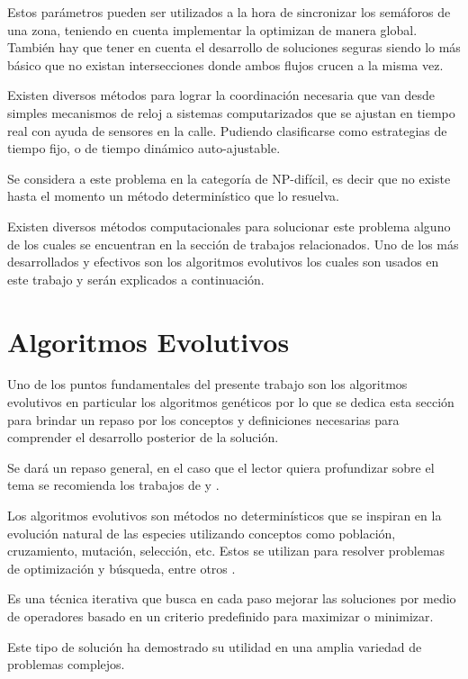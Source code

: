 Estos parámetros pueden ser utilizados a la hora de sincronizar los semáforos de una zona, teniendo en cuenta implementar la optimizan de manera global. También hay que tener en cuenta el desarrollo de soluciones seguras siendo lo más básico que no existan intersecciones donde ambos flujos crucen a la misma vez.

Existen diversos métodos para lograr la coordinación necesaria que van desde simples mecanismos de reloj a sistemas computarizados que se ajustan en tiempo real con ayuda de sensores en la calle. Pudiendo clasificarse como estrategias de tiempo fijo, o de tiempo dinámico auto-ajustable.

Se considera a este problema en la categoría de NP-difícil, es decir que no existe hasta el momento un método determinístico que lo resuelva.

Existen diversos métodos computacionales para solucionar este problema alguno de los cuales se encuentran en la sección de trabajos relacionados. Uno de los más desarrollados y efectivos son los algoritmos evolutivos los cuales son usados en este trabajo y serán explicados a continuación.

\section{Algoritmos Evolutivos}

Uno de los puntos fundamentales del presente trabajo son los algoritmos evolutivos en particular los algoritmos genéticos por lo que se dedica esta sección para  brindar un repaso por los conceptos y definiciones necesarias para comprender el desarrollo posterior de la solución.

Se dará un repaso general, en el caso que el lector quiera profundizar sobre el tema se recomienda los trabajos de \citet{Goldberg1989} y \citet{Mitchell1996}.

Los algoritmos evolutivos son métodos no determinísticos que se inspiran en la evolución natural de las especies utilizando conceptos como población, cruzamiento, mutación, selección, etc. Estos se utilizan para resolver problemas de optimización y búsqueda, entre otros \citep{Nesmachnow2002}.

Es una técnica iterativa que busca en cada paso mejorar las soluciones por medio de operadores basado en un criterio predefinido para maximizar o minimizar.

Este tipo de solución ha demostrado su utilidad en una amplia variedad de problemas complejos.


